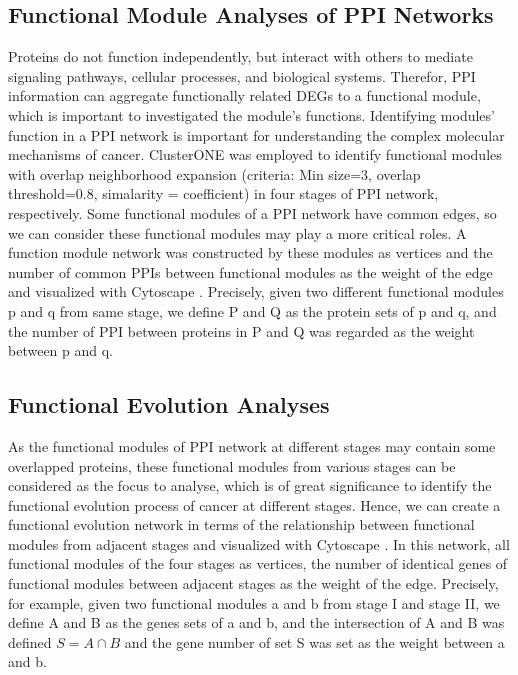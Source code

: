 \documentclass[utf8]{frontiersSCNS} %
\begin{document}
\subsection{Functional Module Analyses of PPI Networks}
Proteins do not function independently, but interact with others to mediate signaling pathways, cellular processes, and biological systems. Therefor, PPI information can aggregate functionally related DEGs to a functional module, which is important to investigated the module’s functions. Identifying modules’ function in a PPI network is important for understanding the complex molecular mechanisms of cancer. 
ClusterONE \citep{nepusz2012detecting} was employed to identify functional modules with overlap neighborhood expansion (criteria: Min size=3, overlap threshold=0.8, simalarity = coefficient) in four stages of PPI network, respectively. Some functional modules of a PPI network have common edges, so we can consider these functional modules may play a more critical roles. A function module network was constructed by these modules as vertices and the number of common PPIs between functional modules as the weight of the edge and visualized with Cytoscape \citep{shannon2003cytoscape}. 
Precisely, given two different functional modules p and q from same stage, we define P and Q as the protein sets of p and q, and the number of PPI between proteins in P and Q was regarded as the weight between p and q. 

\subsection{Functional Evolution Analyses}
As the functional modules of PPI network at different stages may contain some overlapped proteins, these functional modules from various stages can be considered as the focus to analyse, which is of great significance to identify the functional evolution process of cancer at different stages. Hence, we can create a functional evolution network in terms of the relationship between functional modules from adjacent stages and visualized with Cytoscape \citep{shannon2003cytoscape}. In this network, all functional modules of the four stages as vertices, the number of identical genes of functional modules between adjacent stages as the weight of the edge.
Precisely, for example, given two functional modules a and b from stage I and stage II, we define A and B as the genes sets of a and b, and the intersection of A and B was defined $S=A\cap B$ and the gene number of set S was set as the weight between a and b. 
\end{document}
